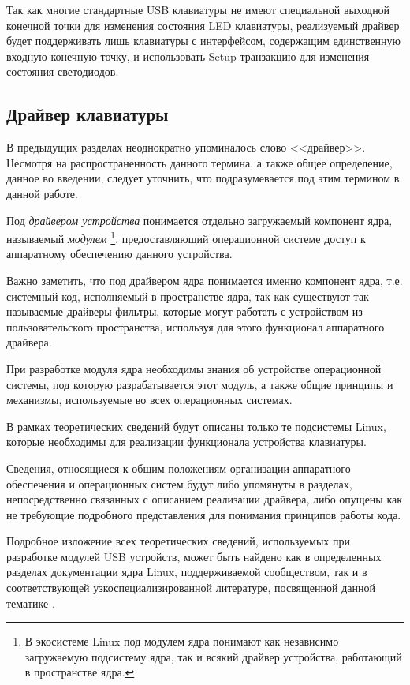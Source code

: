 Так как многие стандартные USB клавиатуры не имеют специальной выходной конечной точки для изменения
состояния LED клавиатуры, реализуемый драйвер будет поддерживать лишь клавиатуры
с интерфейсом, содержащим единственную входную конечную точку, и использовать Setup-транзакцию
для изменения состояния светодиодов.

\subsection{Драйвер клавиатуры}

В предыдущих разделах неоднократно упоминалось слово <<драйвер>>. 
Несмотря на распространенность данного термина, а также общее определение,
данное во введении, следует уточнить, что подразумевается под этим термином в данной работе.

Под \emph{драйвером устройства} понимается отдельно загружаемый компонент ядра,
называемый \emph{модулем} \footnote{%
В экосистеме Linux под модулем ядра понимают как независимо загружаемую подсистему ядра, так и всякий драйвер устройства,
работающий в пространстве ядра.
}, предоставляющий операционной системе доступ к аппаратному обеспечению данного устройства.

Важно заметить, что под драйвером ядра понимается именно компонент ядра, т.е. системный код,
исполняемый в пространстве ядра, так как существуют так называемые драйверы-фильтры, которые могут 
работать с устройством из пользовательского пространства, используя для этого функционал аппаратного драйвера.

При разработке модуля ядра необходимы знания об устройстве операционной системы, под которую разрабатывается этот модуль,
а также общие принципы и механизмы, используемые во всех операционных системах.

В рамках теоретических сведений будут описаны только те подсистемы Linux, которые необходимы для реализации функционала
устройства клавиатуры.

Сведения, относящиеся к общим положениям организации аппаратного обеспечения и операционных систем будут либо упомянуты
в разделах, непосредственно связанных с описанием реализации драйвера, 
либо опущены как не требующие подробного представления для понимания принципов работы кода.

Подробное изложение всех теоретических сведений, 
используемых при разработке модулей USB устройств, может быть найдено как в определенных
разделах документации ядра Linux, поддерживаемой сообществом, так и в соответствующей узкоспециализированной литературе,
посвященной данной тематике \cite{ldd3}.

